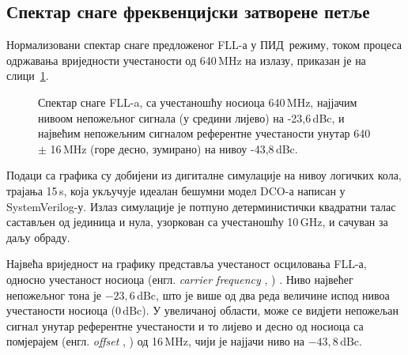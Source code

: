 \documentclass[master]{finthesis}
\makeatletter
\newcommand*{\engl}[2][\@empty]{%
    \edef\theacronym{#1}%
    (енгл. \foreignlanguage{english}{\emph{#2}%
    \ifx\theacronym\@empty \else , #1\fi})%
}
\def \FLL  {FLL} %
\def \DCO  {DCO} %
\def \PID  {ПИД} %
\makeatother
\begin{document}
\subsection{Спектар снаге фреквенцијски затворене петље}
Нормализовани спектар снаге предложеног \FLL-а у \PID\ режиму, током процеса одржавања вриједности учестаности од 640\,MHz на излазу, приказан је на слици~\ref{FLL_spectrum}. \par
\begin{figure}[!ht]
    \centering
    \caption{Спектар снаге \FLL-a, са учестаношћу носиоца 640\,MHz, најјачим нивоом непожељног сигнала (у средини лијево) на -23,6\,dBc, и највећим непожељним сигналом референтне учестаности унутар 640 $\pm$ 16\,MHz (горе десно, зумирано) на нивоу -43,8\,dBc.}
    \label{FLL_spectrum}
\end{figure}
Подаци са графика су добијени из дигиталне симулације на нивоу логичких кола, трајања 15\,\textmu s, која укључује идеалан бешумни модел \DCO-а написан у SystemVerilog-у. Излаз симулације је потпуно детерминистички квадратни талас састављен од јединица и нула, узоркован са учестаношћу 10\,GHz, и сачуван за даљу обраду.\par
Највећа вриједност на графику представља учестаност осциловања \FLL-а, односно учестаност носиоца \engl{carrier frequency}. Ниво највећег непожељног тона је $-23,6\,\text{dBc}$, што је више од два реда величине испод нивоа учестаности носиоца ($0\,\text{dBc}$). У увеличаној области, може се видјети непожељан сигнал унутар референтне учестаности и то лијево и десно од носиоца са помјерајем \engl{offset} од 16\,MHz, чији је најјачи ниво на $-43,8\,\text{dBc}$.
\end{document}
